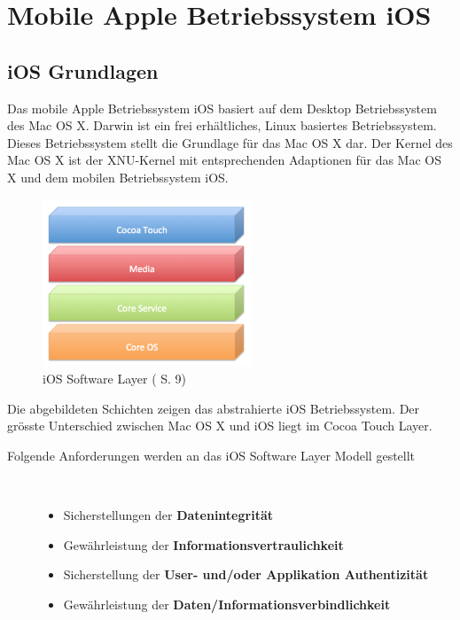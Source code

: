 %
%
% 
% 
% 
\chapter{Mobile Apple Betriebssystem iOS}
\label{ch:iOS}
\section{iOS Grundlagen}
\label{sec:iOSGrundlage}

Das mobile Apple Betriebssystem iOS basiert auf dem Desktop Betriebssystem des Mac OS X. Darwin ist ein frei erhältliches, Linux basiertes Betriebssystem. Dieses Betriebssystem stellt die Grundlage für das Mac OS X dar. Der Kernel des Mac OS X ist der XNU-Kernel mit entsprechenden Adaptionen für das Mac OS X und dem mobilen Betriebssystem iOS.\par 
\begin{figure}[hp!]
        \centering
                \includegraphics[height=5cm]{Bilder/Chapter3_SystemArchitektur}
        \caption{iOS Software Layer (\cite{Apple[5]} S. 9)}
        	\label{fig:iOS Software Layer}
\end{figure}
Die abgebildeten Schichten zeigen das abstrahierte iOS Betriebssystem. Der grösste Unterschied zwischen Mac OS X und iOS liegt im Cocoa Touch Layer.
\begin{description}
\item[Folgende Anforderungen werden an das iOS Software Layer Modell gestellt]~\par
	\begin{itemize}
		\item Sicherstellungen der \textbf{Datenintegrität}
		\item Gewährleistung der \textbf{Informationsvertraulichkeit}
		\item Sicherstellung der \textbf{User- und/oder Applikation Authentizität}
		\item Gewährleistung der \textbf{Daten/Informationsverbindlichkeit}
	\end{itemize}
\end{description}
